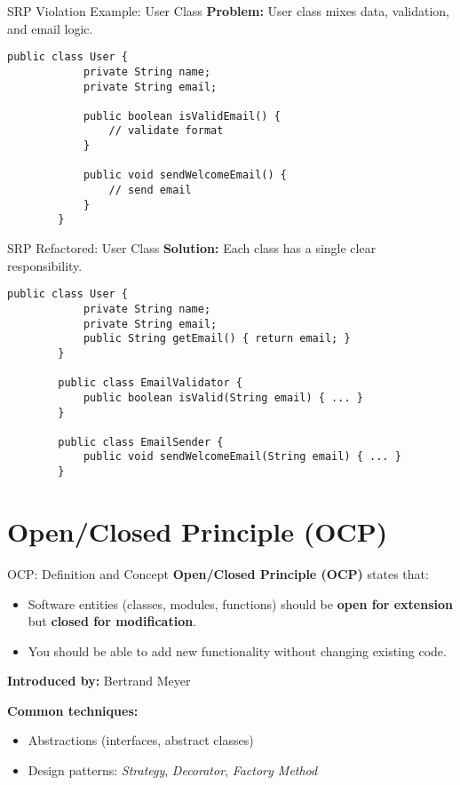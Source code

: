 \documentclass[aspectratio=169, table]{beamer}
\begin{document}
\begin{frame}[fragile]{SRP Violation Example: User Class}
	\vspace{20pt}
	\textbf{Problem:} User class mixes data, validation, and email logic.
	\begin{lstlisting}[style=JavaStyle]
		public class User {
			private String name;
			private String email;
			
			public boolean isValidEmail() {
				// validate format
			}
			
			public void sendWelcomeEmail() {
				// send email
			}
		}
	\end{lstlisting}
\end{frame}

\begin{frame}[fragile]{SRP Refactored: User Class}
	\vspace{20pt}
	\textbf{Solution:} Each class has a single clear responsibility.
	\begin{lstlisting}[style=JavaStyle]
		public class User {
			private String name;
			private String email;
			public String getEmail() { return email; }
		}
		
		public class EmailValidator {
			public boolean isValid(String email) { ... }
		}
		
		public class EmailSender {
			public void sendWelcomeEmail(String email) { ... }
		}
	\end{lstlisting}
\end{frame}

\section{Open/Closed Principle (OCP)}

\begin{frame}[fragile]{OCP: Definition and Concept}
	\vspace{20pt}
	\textbf{Open/Closed Principle (OCP)} states that:
	\begin{itemize}
		\item Software entities (classes, modules, functions) should be \textbf{open for extension} but \textbf{closed for modification}.
		\item You should be able to add new functionality without changing existing code.
	\end{itemize}
	
	\textbf{Introduced by:} Bertrand Meyer
	
	\textbf{Common techniques:}
	\begin{itemize}
		\item Abstractions (interfaces, abstract classes)
		\item Design patterns: \textit{Strategy}, \textit{Decorator}, \textit{Factory Method}
	\end{itemize}
\end{frame}
\end{document}
